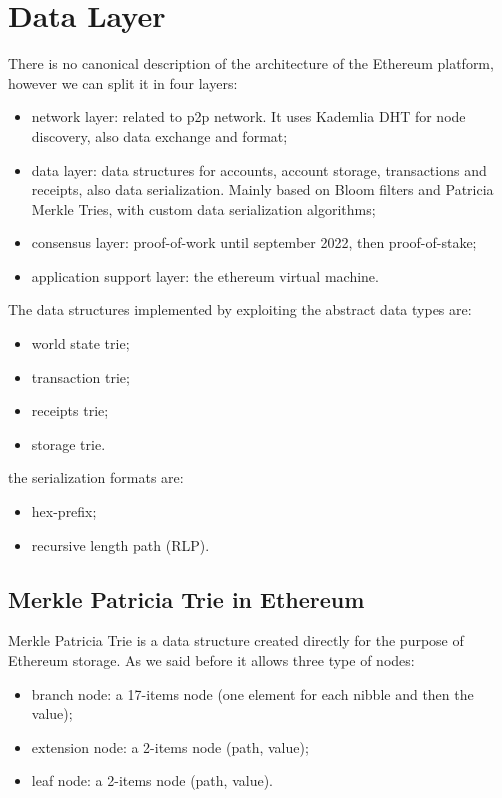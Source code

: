 \section{Data Layer}
There is no canonical description of the architecture of the Ethereum platform, however we can split it in four layers:
\begin{itemize}
    \item network layer: related to p2p network.
    It uses Kademlia DHT for node discovery, also data exchange and format;

    \item data layer: data structures for accounts, account storage, transactions and receipts, also data serialization.
    Mainly based on Bloom filters and Patricia Merkle Tries, with custom data serialization algorithms;

    \item consensus layer: proof-of-work until september 2022, then proof-of-stake;

    \item application support layer: the ethereum virtual machine.
\end{itemize}

The data structures implemented by exploiting the abstract data types are:
\begin{itemize}
    \item world state trie;
    \item transaction trie;
    \item receipts trie;
    \item storage trie.
\end{itemize}
the serialization formats are:
\begin{itemize}
    \item hex-prefix;
    \item recursive length path (RLP).
\end{itemize}

\subsection{Merkle Patricia Trie in Ethereum}
Merkle Patricia Trie is a data structure created directly for the purpose of Ethereum storage.
As we said before it allows three type of nodes:
\begin{itemize}
    \item branch node: a 17-items node (one element for each nibble and then the value);
    \item extension node: a 2-items node (path, value);
    \item leaf node: a 2-items node (path, value).
\end{itemize}

